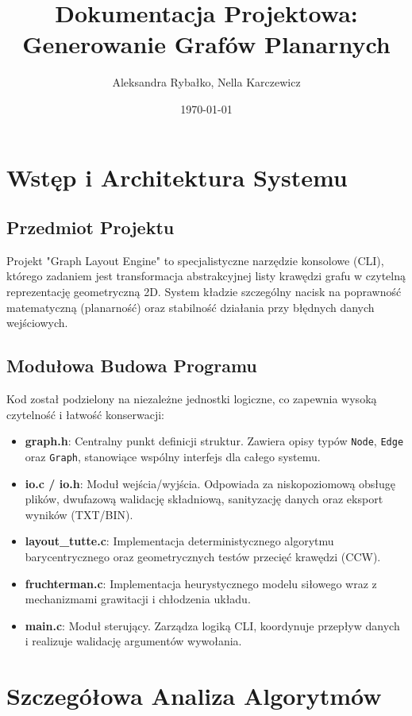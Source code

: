 \documentclass[12pt,a4paper]{article}
\title{Dokumentacja Projektowa:\\Generowanie Grafów Planarnych}
\author{Aleksandra Rybałko, Nella Karczewicz}
\date{\today}
\begin{document}
\maketitle


\tableofcontents
\newpage

\section{Wstęp i Architektura Systemu}
\subsection{Przedmiot Projektu}
Projekt "Graph Layout Engine" to specjalistyczne narzędzie konsolowe (CLI), którego zadaniem jest transformacja abstrakcyjnej listy krawędzi grafu w czytelną reprezentację geometryczną 2D. System kładzie szczególny nacisk na poprawność matematyczną (planarność) oraz stabilność działania przy błędnych danych wejściowych.

\subsection{Modułowa Budowa Programu}
Kod został podzielony na niezależne jednostki logiczne, co zapewnia wysoką czytelność i łatwość konserwacji:
\begin{itemize}[label=\textbullet]
    \item \textbf{graph.h}: Centralny punkt definicji struktur. Zawiera opisy typów \texttt{Node}, \texttt{Edge} oraz \texttt{Graph}, stanowiące wspólny interfejs dla całego systemu.
    \item \textbf{io.c / io.h}: Moduł wejścia/wyjścia. Odpowiada za niskopoziomową obsługę plików, dwufazową walidację składniową, sanityzację danych oraz eksport wyników (TXT/BIN).
    \item \textbf{layout\_tutte.c}: Implementacja deterministycznego algorytmu barycentrycznego oraz geometrycznych testów przecięć krawędzi (CCW).
    \item \textbf{fruchterman.c}: Implementacja heurystycznego modelu siłowego wraz z mechanizmami grawitacji i chłodzenia układu.
    \item \textbf{main.c}: Moduł sterujący. Zarządza logiką CLI, koordynuje przepływ danych i realizuje walidację argumentów wywołania.
\end{itemize}

\section{Szczegółowa Analiza Algorytmów}
\end{document}
